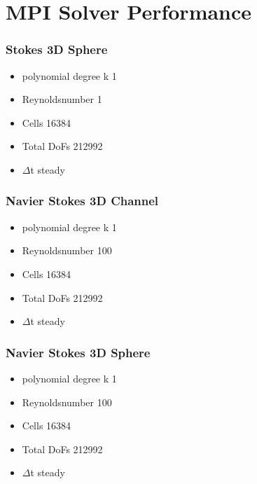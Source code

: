 \documentclass{article}
\begin{document}
\part*{MPI Solver Performance}
\newpage
\section{Stokes 3D Sphere}
\begin{itemize}
	\large \item  polynomial degree k 1
	\item Reynoldsnumber 1
	\item Cells 16384
	\item Total DoFs 212992
	\item $\Delta$t steady
\end{itemize}

\newpage
\section{Navier Stokes 3D Channel}
\begin{itemize}
	\large \item  polynomial degree k 1
	\item Reynoldsnumber 100
	\item Cells 16384
	\item Total DoFs 212992
	\item $\Delta$t steady
\end{itemize}
%
\newpage
\section{Navier Stokes 3D Sphere}
\begin{itemize}
	\large \item  polynomial degree k 1
	\item Reynoldsnumber 100
	\item Cells 16384
	\item Total DoFs 212992
	\item $\Delta$t steady
\end{itemize}

\end{document}
